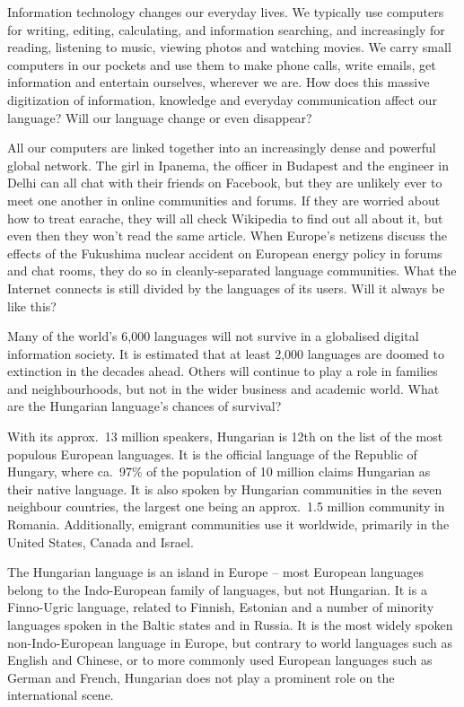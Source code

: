 \begin{multicols}{2}

Information technology changes our everyday lives. We typically use computers for writing, editing, calculating, and information searching, and increasingly for reading, listening to music, viewing photos and watching movies. We carry small computers in our pockets and use them to make phone calls, write emails, get information and entertain ourselves, wherever we are. How does this massive digitization of information, knowledge and everyday communication affect our language? Will our language change or even disappear? 

All our computers are linked together into an increasingly dense and powerful global network. The girl in Ipanema, the officer in Budapest and the engineer in Delhi can all chat with their friends on Facebook, but they are unlikely ever to meet one another in online communities and forums. If they are worried about how to treat earache, they will all check Wikipedia to find out all about it, but even then they won’t read the same article. When Europe's netizens discuss the effects of the Fukushima nuclear accident on European energy policy in forums and chat rooms, they do so in cleanly-separated language communities. What the Internet connects is still divided by the languages of its users. Will it always be like this? 

Many of the world’s 6,000 languages will not survive in a globalised digital information society. It is estimated that at least 2,000 languages are doomed to extinction in the decades ahead. Others will continue to play a role in families and neighbourhoods, but not in the wider business and academic world. What are the Hungarian language’s chances of survival? 

With its approx.~13 million speakers, Hungarian is 12th on the list of the most populous European languages. It is the official language of the Republic of Hungary, where ca.~97\% of the population of 10 million claims Hungarian as their native language. It is also spoken by Hungarian communities in the seven neighbour countries, the largest one being an approx.~1.5 million community in Romania. Additionally, emigrant communities use it worldwide, primarily in the United States, Canada and Israel.

The Hungarian language is an island in Europe -- most European languages belong to the Indo-European family of languages, but not Hungarian. It is a Finno-Ugric language, related to Finnish, Estonian and a number of minority languages spoken in the Baltic states and in Russia. It is the most widely spoken non-Indo-European language in Europe, but contrary to world languages such as English and Chinese, or to more commonly used European languages such as German and French, Hungarian does not play a prominent role on the international scene. 


\end{multicols}
